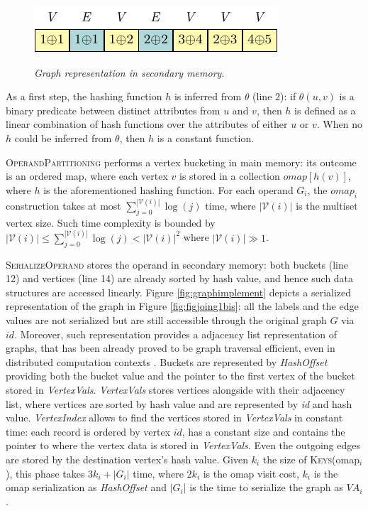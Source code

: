 \begin{figure}[!t]
	\begin{minipage}[b]{\textwidth}
		\centering
		\includegraphics[width=.5\textwidth]{fig/03joins/02dlgorithm.pdf}
		\label{fig:graphserres}
	\end{minipage}%
	
	
	\caption{\textit{Graph representation in secondary memory}.}
\end{figure}
As a first step, the hashing function $h$ is inferred from $\theta$ (line 2): if $\theta(u,v)$ is a binary
predicate between distinct attributes from $u$ and $v$, then $h$ is defined as a linear combination of
hash functions over the attributes of either $u$ or $v$. When no $h$ {{could}} be inferred from $\theta$, then
$h$ is a constant function.

\textsc{OperandPartitioning} performs a vertex bucketing in main memory: its outcome
is an ordered map, where each vertex $v$ is stored in a collection $omap[h(v)]$, where $h$ is the aforementioned hashing function. For each operand $G_i$, the $omap_i$ construction  takes at most $\sum_{j=0}^{|\mathcal V(i)|}\log(j)$ time,
where $|\mathcal V(i)|$ is the multiset vertex size. Such time complexity
is bounded by $|\mathcal V(i)|\leq \sum_{j=0}^{|\mathcal V(i)|}\log(j)<|\mathcal V(i)|^2$ where $|\mathcal V(i)|\gg 1$.

\textsc{SerializeOperand} stores the operand in secondary memory: both buckets (line 12)
and vertices (line 14) are already sorted by hash value, and hence such data
structures are accessed linearly. Figure \ref{fig:graphimplement} depicts a serialized
representation of the graph in Figure \ref{fig:figjoing1bis}: all the labels and the edge values are not serialized but are still accessible through
the original graph $G$ via $id$. Moreover, such representation provides a adjacency list representation of graphs, that has been already proved to be graph traversal efficient, even in distributed computation contexts \cite{Labouseur2015}. Buckets are represented by \textit{HashOffset} providing both the bucket value
and the pointer to the first vertex of the bucket stored in \textit{VertexVals}.
\textit{VertexVals} stores vertices alongside with their adjacency list, where vertices are sorted by hash value
and are represented by \textit{id} and hash value.
\textit{VertexIndex} allows to find the vertices stored in \textit{VertexVals} in constant time:
each record  is ordered by vertex $id$, has a constant size
and contains the pointer to where the vertex data is stored in \textit{VertexVals}.
Even the outgoing edges are stored by the destination vertex's hash value.
Given $k_i$ the size of \textsc{Keys}(omap$_i$), this phase takes $3k_i+|G_i|$ time, where
$2k_i$ is the omap visit cost, $k_i$ is the omap serialization as \textit{HashOffset} and
$|G_i|$ is the time to serialize the graph as $VA_i$.


